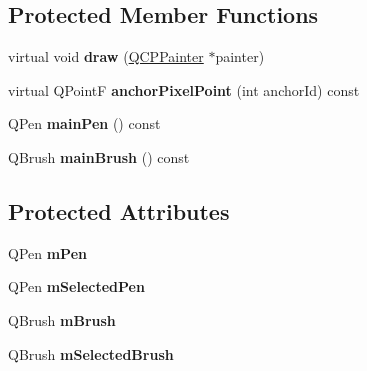 \subsection*{Protected Member Functions}
\begin{DoxyCompactItemize}
\item 
\hypertarget{classQCPItemEllipse_afe97ec827adb05f000fe007783faae3c}{}virtual void {\bfseries draw} (\hyperlink{classQCPPainter}{Q\+C\+P\+Painter} $\ast$painter)\label{classQCPItemEllipse_afe97ec827adb05f000fe007783faae3c}

\item 
\hypertarget{classQCPItemEllipse_ad3c607304dba081e2f778b6a81b903bb}{}virtual Q\+Point\+F {\bfseries anchor\+Pixel\+Point} (int anchor\+Id) const \label{classQCPItemEllipse_ad3c607304dba081e2f778b6a81b903bb}

\item 
\hypertarget{classQCPItemEllipse_afc78d49ed5ffa886bccf18f297f83d30}{}Q\+Pen {\bfseries main\+Pen} () const \label{classQCPItemEllipse_afc78d49ed5ffa886bccf18f297f83d30}

\item 
\hypertarget{classQCPItemEllipse_a2a9757204877c9d0fd07adfb26d6b1d8}{}Q\+Brush {\bfseries main\+Brush} () const \label{classQCPItemEllipse_a2a9757204877c9d0fd07adfb26d6b1d8}

\end{DoxyCompactItemize}
\subsection*{Protected Attributes}
\begin{DoxyCompactItemize}
\item 
\hypertarget{classQCPItemEllipse_a16ad9389acf028a7e4ac8fd7a550b2e4}{}Q\+Pen {\bfseries m\+Pen}\label{classQCPItemEllipse_a16ad9389acf028a7e4ac8fd7a550b2e4}

\item 
\hypertarget{classQCPItemEllipse_a57b047abfce6f1a84ed46ca668c90e21}{}Q\+Pen {\bfseries m\+Selected\+Pen}\label{classQCPItemEllipse_a57b047abfce6f1a84ed46ca668c90e21}

\item 
\hypertarget{classQCPItemEllipse_a6fa59478cd3ad1b10e6c1f6cedc84bd6}{}Q\+Brush {\bfseries m\+Brush}\label{classQCPItemEllipse_a6fa59478cd3ad1b10e6c1f6cedc84bd6}

\item 
\hypertarget{classQCPItemEllipse_a2e49d5547478aa36910ed8a2dcc8a5c0}{}Q\+Brush {\bfseries m\+Selected\+Brush}\label{classQCPItemEllipse_a2e49d5547478aa36910ed8a2dcc8a5c0}

\end{DoxyCompactItemize}
